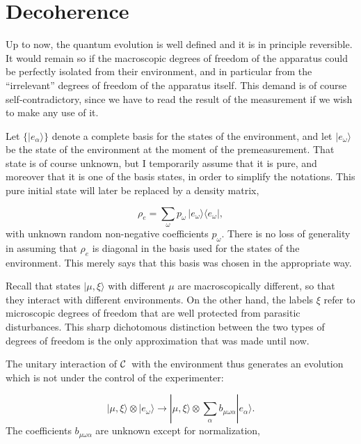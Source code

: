 \documentclass[12pt]{article}
\def\beq{\begin{equation}}
\def\eeq{\end{equation}}
\def\0{\otimes}
\def\6{\langle}
\def\9{\rangle}
\def\cC{$\cal C$}
\begin{document}
\section{Decoherence}

Up to now, the quantum evolution is well defined and it is in principle
reversible. It would remain so if the macroscopic degrees of freedom of
the apparatus could be perfectly isolated from their environment, and in
particular from the ``irrelevant'' degrees of freedom of the apparatus
itself. This demand is of course self-contradictory, since we have to
read the result of the measurement if we wish to make any use of it.

Let $\{|e_\alpha\9\}$ denote a complete basis for the states of the
environment, and let $|e_\omega\9$ be the state of the environment at
the moment of the premeasurement. That state is of course unknown, but I
temporarily assume that it is pure, and moreover that it is one of the
basis states, in order to simplify the notations. This pure initial
state will later be replaced by a density matrix,

\beq \rho_e=\sum_\omega p_\omega\,|e_\omega\9\6e_\omega|,
 \label{rhoenv} \eeq
with unknown random non-negative coefficients $p_\omega$. There is no
loss of generality in assuming that $\rho_e$ is diagonal in the basis
used for the states of the environment. This merely says that this basis
was chosen in the appropriate way.

Recall that states $|\mu,\xi\9$ with different $\mu$ are macroscopically
different, so that they interact with different environments. On the
other hand, the labels $\xi$ refer to micro\-scopic degrees of freedom
that are well protected from parasitic disturbances. This sharp
dichotomous distinction between the two types of degrees of freedom is
the only approximation that was made until now.

The unitary interaction of \cC\ with the environment thus generates an
evolution which is not under the control of the experimenter:

\beq |\mu,\xi\9\0|e_\omega\9\to
 |\mu,\xi\9\0\sum_\alpha b_{\mu\omega\alpha}|e_\alpha\9.
 \label{deco}\eeq
The coefficients $b_{\mu\omega\alpha}$ are unknown except for
normalization,
\end{document}
